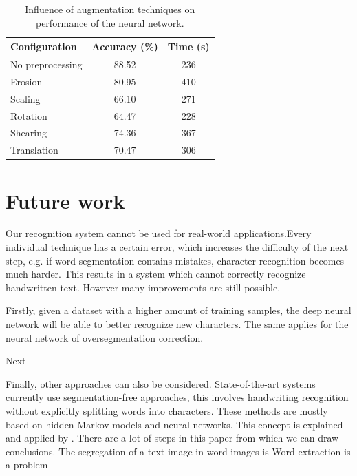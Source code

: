 \documentclass{article}
\begin{document}
\begin{table}
\caption{Influence of augmentation techniques on performance of the neural network.}
\label{tab:preprocess}
\vskip 0.15in
\begin{center}
\begin{small}
\begin{sc}
\begin{tabular}{lcc} 
\hline 
\abovespace\belowspace 
Configuration & Accuracy (\%) & Time (s) \\ 
\hline 
\abovespace
No preprocessing & 88.52 & 236 \\
Erosion & 80.95 & 410 \\
Scaling & 66.10 & 271 \\
Rotation & 64.47 & 228 \\
Shearing & 74.36 & 367 \\
Translation & 70.47 & 306 \\
\hline 
\end{tabular} 
\end{sc}
\end{small}
\end{center}
\vskip -0.1in 
\end{table} 


\section{Future work}
Our recognition system cannot be used for real-world applications.Every individual technique has a certain error, which increases the difficulty of the next step, e.g. if word segmentation contains mistakes, character recognition becomes much harder. 
This results in a system which cannot correctly recognize handwritten text. 
However many improvements are still possible. 

Firstly, given a dataset with a higher amount of training samples, the deep neural network will be able to better recognize new characters. The same applies for the neural network of oversegmentation correction. 

Next %

Finally, other approaches can also be considered. 
State-of-the-art systems currently use segmentation-free approaches, this involves handwriting recognition without explicitly splitting words into characters. These methods are mostly based on hidden Markov models and neural networks.
This concept is explained and applied by \citep{presham}.
There are a lot of steps in this paper from which we can draw conclusions.
The segregation of a text image in word images is  
Word extraction is a problem 
\end{document}
